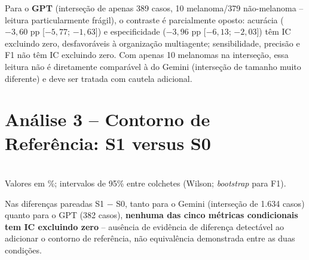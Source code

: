 Para o \textbf{GPT} (interseção de apenas 389 casos, 10 melanoma/379 não-melanoma -- leitura particularmente frágil), o contraste é parcialmente oposto: acurácia ($-3,60$ pp [$-5,77$; $-1,63$]) e especificidade ($-3,96$ pp [$-6,13$; $-2,03$]) têm IC excluindo zero, desfavoráveis à organização multiagente; sensibilidade, precisão e F1 não têm IC excluindo zero. Com apenas 10 melanomas na interseção, essa leitura não é diretamente comparável à do Gemini (interseção de tamanho muito diferente) e deve ser tratada com cautela adicional.

\section{Análise 3 -- Contorno de Referência: S1 versus S0}
\label{sec:resultados_analise3}

\begin{table}[H]
	\centering
	\caption{Análise 3 -- multiagente em S1 versus S0, por modelo, 3.000 lesões.}
	\label{tab:analise3}
	\\ \footnotesize Valores em \%; intervalos de 95\% entre colchetes (Wilson; \textit{bootstrap} para F1).
\end{table}

Nas diferenças pareadas S1 $-$ S0, tanto para o Gemini (interseção de 1.634 casos) quanto para o GPT (382 casos), \textbf{nenhuma das cinco métricas condicionais tem IC excluindo zero} -- ausência de evidência de diferença detectável ao adicionar o contorno de referência, não equivalência demonstrada entre as duas condições.

